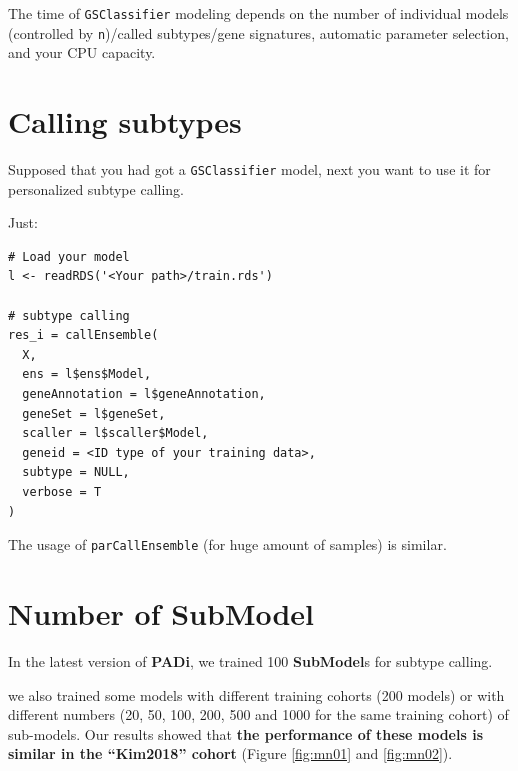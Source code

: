 \documentclass[
  12pt,
]{book}
\newcommand{\passthrough}[1]{#1}
\begin{document}
The time of \passthrough{\lstinline!GSClassifier!} modeling depends on the number of individual models (controlled by \passthrough{\lstinline!n!})/called subtypes/gene signatures, automatic parameter selection, and your CPU capacity.

\hypertarget{calling-subtypes}{%
\section{Calling subtypes}\label{calling-subtypes}}

Supposed that you had got a \passthrough{\lstinline!GSClassifier!} model, next you want to use it for personalized subtype calling.

Just:

\begin{lstlisting}
# Load your model
l <- readRDS('<Your path>/train.rds')

# subtype calling
res_i = callEnsemble(
  X,
  ens = l$ens$Model,
  geneAnnotation = l$geneAnnotation,
  geneSet = l$geneSet,
  scaller = l$scaller$Model,
  geneid = <ID type of your training data>,
  subtype = NULL,
  verbose = T
)
\end{lstlisting}

The usage of \passthrough{\lstinline!parCallEnsemble!} (for huge amount of samples) is similar.

\hypertarget{topicSubmodel}{%
\section{Number of SubModel}\label{topicSubmodel}}

In the latest version of \textbf{PADi}, we trained 100 \textbf{SubModel}s for subtype calling.

we also trained some models with different training cohorts (200 models) or with different numbers (20, 50, 100, 200, 500 and 1000 for the same training cohort) of sub-models. Our results showed that \textbf{the performance of these models is similar in the ``Kim2018'' cohort} (Figure \ref{fig:mn01} and \ref{fig:mn02}).
\end{document}
